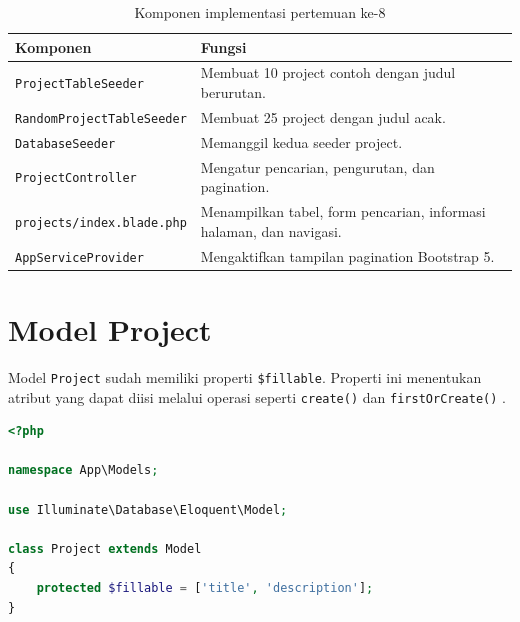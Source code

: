 \documentclass[a4paper,oneside,11pt]{book}
\renewcommand{\_}{\textunderscore\allowbreak{}}
\begin{document}
\begin{table}[H]
    \centering
    \caption{Komponen implementasi pertemuan ke-8}
    \label{tab:komponen}
    \renewcommand{\arraystretch}{1.3}
    \begin{tabularx}{\textwidth}{
        |>{\raggedright\arraybackslash}p{5cm}
        |>{\raggedright\arraybackslash}X|
    }
        \hline
        \textbf{Komponen} & \textbf{Fungsi} \\ \hline
        \texttt{ProjectTableSeeder}
        & Membuat 10 project contoh dengan judul berurutan. \\ \hline

        \texttt{RandomProject\-TableSeeder}
        & Membuat 25 project dengan judul acak. \\ \hline

        \texttt{DatabaseSeeder}
        & Memanggil kedua seeder project. \\ \hline

        \texttt{ProjectController}
        & Mengatur pencarian, pengurutan, dan pagination. \\ \hline

        \texttt{projects/index.blade.php}
        & Menampilkan tabel, form pencarian, informasi halaman, dan navigasi. \\ \hline

        \texttt{AppServiceProvider}
        & Mengaktifkan tampilan pagination Bootstrap 5. \\ \hline
    \end{tabularx}
\end{table}

\section{Model Project}

Model \texttt{Project} sudah memiliki properti
\texttt{\$fillable}. Properti ini menentukan atribut yang dapat diisi
melalui operasi seperti \texttt{create()} dan
\texttt{firstOrCreate()} \cite{laravel-eloquent}.

\begin{lstlisting}[language=PHP,caption={Model Project}]
<?php

namespace App\Models;

use Illuminate\Database\Eloquent\Model;

class Project extends Model
{
    protected $fillable = ['title', 'description'];
}
\end{lstlisting}
\end{document}
